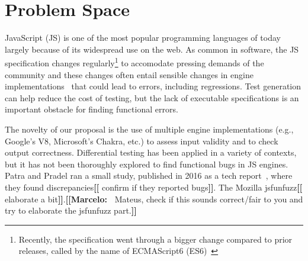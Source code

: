 \documentclass[11pt]{article}
\newcommand{\eg}{e.g.}
\newcommand{\Fix}[1]{\textbf{[[}{\color{red} #1}\textbf{]]}}
\newcommand{\Mar}[1]{\textbf{[[Marcelo:~}{\color{blue} #1}\textbf{]]}}
\newcommand{\Comment}[1]{}
\begin{document}
\section{Problem Space}



JavaScript (JS) is one of the most popular programming languages of
today~\cite{business-insider,stackify} largely because of its
widespread use on the web. As common in software, the JS specification
changes regularly\footnote{Recently, the specification went through a
  bigger change compared to prior releases, called by the name of
  ECMAScript6 (ES6)~\cite{es6-features}} to accomodate pressing
demands of the community and these changes often entail sensible
changes in engine implementations~\cite{kangax} that could lead to
errors, including regressions.  Test generation can help reduce the
cost of testing, but the lack of executable specifications is an
important obstacle for finding functional errors.

\begin{center}
\end{center}

The novelty of our proposal is the use of multiple engine
implementations (\eg{}, Google's V8, Microsoft's Chakra, etc.) to
assess input validity and to check output correctness. Differential
testing\cite{McKeeman98differentialtesting} has been applied in a
variety of
contexts\cite{Brumley-etal-ss07,Yang-etal-pldi11,Chen-etal-fse2015,Argyros-etla-ccs16,Chen-etal-pldi16,petsios-etal-sp2017,SivakornAPKJ17},
but it has not been thoroughly explored to find functional bugs in JS
engines. Patra and Pradel ran a small study, published in 2016 as
a tech report~\cite{patra2016learning}, where they found
discrepancies\Fix{confirm if they reported bugs}. The Mozilla
jsfunfuzz\Fix{elaborate a bit}.\Mar{Mateus, check if this sounds
  correct/fair to you and try to elaborate the jsfunfuzz part.}
\end{document}
